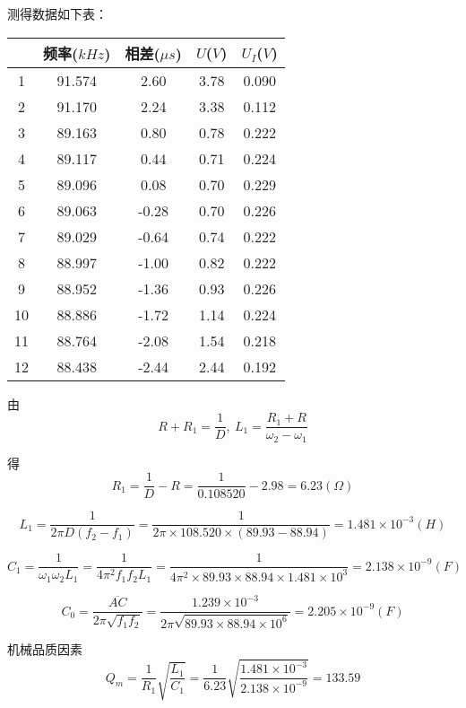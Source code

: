 \documentclass{thureport}
\begin{document}
测得数据如下表：
\begin{table}[htbp]
    \centering
      \begin{tabular}{|c|c|c|c|c|}
      \hline
            & 频率($kHz$) & 相差($\mu s$) & $U$($V$) & $U_I$($V$) \bigstrut\\
      \hline
      1     & 91.574  & 2.60  & 3.78  & 0.090  \bigstrut\\
      \hline
      2     & 91.170  & 2.24  & 3.38  & 0.112  \bigstrut\\
      \hline
      3     & 89.163  & 0.80  & 0.78  & 0.222  \bigstrut\\
      \hline
      4     & 89.117  & 0.44  & 0.71  & 0.224  \bigstrut\\
      \hline
      5     & 89.096  & 0.08  & 0.70  & 0.229  \bigstrut\\
      \hline
      6     & 89.063  & -0.28  & 0.70  & 0.226  \bigstrut\\
      \hline
      7     & 89.029  & -0.64  & 0.74  & 0.222  \bigstrut\\
      \hline
      8     & 88.997  & -1.00  & 0.82  & 0.222  \bigstrut\\
      \hline
      9     & 88.952  & -1.36  & 0.93  & 0.226  \bigstrut\\
      \hline
      10    & 88.886  & -1.72  & 1.14  & 0.224  \bigstrut\\
      \hline
      11    & 88.764  & -2.08  & 1.54  & 0.218  \bigstrut\\
      \hline
      12    & 88.438  & -2.44  & 2.44  & 0.192  \bigstrut\\
      \hline
      \end{tabular}%
    \label{tab:addlabel}%
  \end{table}%

由
$$R+R_1=\frac{1}{D},\ L_1=\frac{R_1+R}{\omega_2-\omega_1}$$

得
$$R_1=\frac{1}{D}-R=\frac{1}{0.108520}-2.98=6.23(\Omega)$$

$$L_1=\frac{1}{2\pi D(f_2-f_1)}=\frac{1}{2\pi\times108.520\times(89.93-88.94)}=1.481\times10^{-3}(H)$$

$$C_1=\frac{1}{\omega_1\omega_2L_1}=\frac{1}{4\pi^2f_1f_2L_1}=\frac{1}{4\pi^2\times89.93\times88.94\times1.481\times10^3}=2.138\times10^{-9}(F)$$

$$C_0=\frac{\overline{AC}}{2\pi\sqrt{f_1f_2}}=\frac{1.239\times10^{-3}}{2\pi\sqrt{89.93\times88.94\times10^6}}=2.205\times10^{-9}(F)$$

机械品质因素
$$Q_m=\frac{1}{R_1}\sqrt{\frac{L_1}{C_1}}=\frac{1}{6.23}\sqrt{\frac{1.481\times10^{-3}}{2.138\times10^{-9}}}=133.59$$
\end{document}
